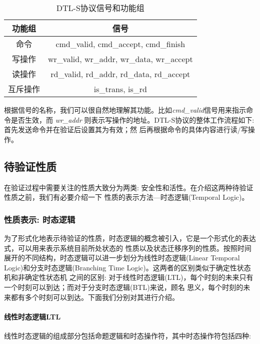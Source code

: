 \begin{table}[ht]
  \caption{DTL-S协议信号和功能组}
  \label{tab:dtl}
  \centering
  \begin{tabular}{|c|c|}
  \hline
  \hline
  功能组  & 信号\\ [0.5ex]
  \hline
  命令    & cmd\_valid, cmd\_accept, cmd\_finish\\
  \hline
  写操作  & wr\_valid, wr\_addr, wr\_data, wr\_accept\\
  \hline
  读操作  & rd\_valid, rd\_addr, rd\_data, rd\_accept\\
  \hline
  互斥操作  & is\_trans, is\_rd\\
  \hline
  
  \hline\hline
 \end{tabular}
\end{table}


根据信号的名称，我们可以很自然地理解其功能。比如{\em cmd\_valid}信号用来指示命令是否生效，而{\em
  wr\_addr} 则表示写操作的地址。DTL-S协议的整体工作流程如下: 首先发送命令并在验证后设置其为有效；然
后再根据命令的具体内容进行读/写操作。

\subsection{待验证性质}
\label{sec:hierarchy-puv}
在验证过程中需要关注的性质大致分为两类: 安全性和活性。在介绍这两种待验证性质之前，我们有必要介绍一下
性质的表示方法---时态逻辑(Temporal Logic)。

\subsubsection{性质表示: 时态逻辑}
\label{sec:temporal-logic}
为了形式化地表示待验证的性质，时态逻辑的概念被引入，它是一个形式化的表达式，可以用来表示系统目前所处状态的
性质以及状态迁移序列的性质。按照时间展开的不同结构，时态逻辑可以进一步划分为线性时态逻辑(Linear
Temporal Logic)和分支时态逻辑(Branching Time Logic)。这两者的区别类似于确定性状态机和非确定性状态机
之间的区别: 对于线性时态逻辑(LTL)，每个时刻的未来只有一个时刻可以到达；而对于分支时态逻辑(BTL)来说，顾名
思义，每个时刻的未来都有多个时刻可以到达。下面我们分别对其进行介绍。

\paragraph{线性时态逻辑LTL}
\label{sec:ltl}

线性时态逻辑的组成部分包括命题逻辑和时态操作符，其中时态操作符包括四种\cite{Book_Bianjn}:

